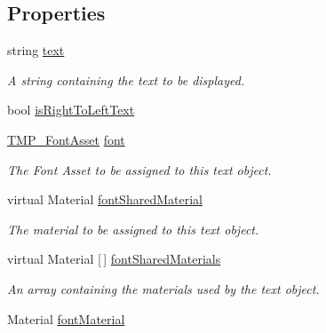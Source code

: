 \subsection*{Properties}
\begin{DoxyCompactItemize}
\item 
string \mbox{\hyperlink{class_t_m_pro_1_1_t_m_p___text_a98a04e5078612c0586472bd510f91f5c}{text}}
\begin{DoxyCompactList}\small\item\em A string containing the text to be displayed. \end{DoxyCompactList}\item 
bool \mbox{\hyperlink{class_t_m_pro_1_1_t_m_p___text_acd612ae07363999901c0a12d76528215}{is\+Right\+To\+Left\+Text}}
\item 
\mbox{\hyperlink{class_t_m_pro_1_1_t_m_p___font_asset}{T\+M\+P\+\_\+\+Font\+Asset}} \mbox{\hyperlink{class_t_m_pro_1_1_t_m_p___text_a0a55f0d5dc209d8b265113c2669fd980}{font}}
\begin{DoxyCompactList}\small\item\em The Font Asset to be assigned to this text object. \end{DoxyCompactList}\item 
virtual Material \mbox{\hyperlink{class_t_m_pro_1_1_t_m_p___text_ae8499604279c5c7af4ce94b3ba839a32}{font\+Shared\+Material}}
\begin{DoxyCompactList}\small\item\em The material to be assigned to this text object. \end{DoxyCompactList}\item 
virtual Material \mbox{[}$\,$\mbox{]} \mbox{\hyperlink{class_t_m_pro_1_1_t_m_p___text_ad5f432b62b573b9d9156443562c7d840}{font\+Shared\+Materials}}
\begin{DoxyCompactList}\small\item\em An array containing the materials used by the text object. \end{DoxyCompactList}\item 
Material \mbox{\hyperlink{class_t_m_pro_1_1_t_m_p___text_a43469e73ada24bcd98556df734ed3062}{font\+Material}}

\end{DoxyCompactItemize}
